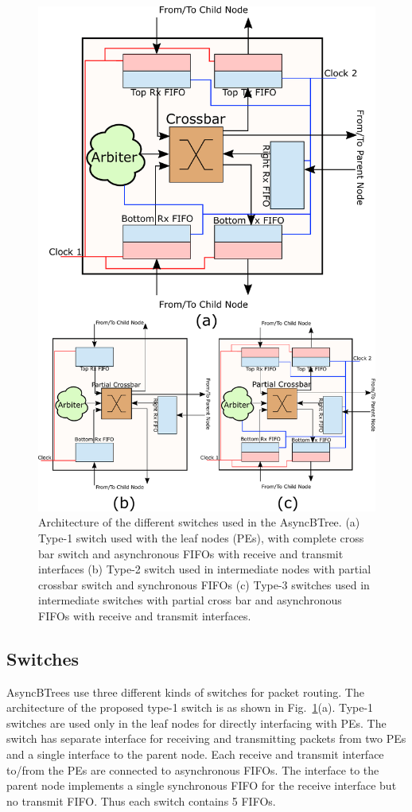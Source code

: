 \begin{figure}[t]
\centering
   \includegraphics[width=\columnwidth]{Figures/switch1_2.pdf}
   \caption{Architecture of the different switches used in the AsyncBTree. (a) Type-1 switch used with the leaf nodes (PEs), with complete cross bar switch and asynchronous 
   FIFOs with receive and transmit interfaces (b) Type-2 switch used in intermediate nodes with partial crossbar switch and synchronous FIFOs (c) Type-3 switches used in intermediate
   switches with partial cross bar and asynchronous FIFOs with receive and transmit interfaces.}
   \label{fig:switchArch}
\end{figure}

\subsection{Switches}
\label{sec:switch}
AsyncBTrees use three different kinds of switches for packet routing.
The architecture of the proposed type-1 switch is as shown in Fig.~\ref{fig:switchArch}(a).
Type-1 switches are used only in the leaf nodes for directly interfacing with PEs.
The switch has separate interface for receiving and transmitting packets from two PEs and a single interface to the parent node.
Each receive and transmit interface to/from the PEs are connected to asynchronous FIFOs.
The interface to the parent node implements a single synchronous FIFO for the receive interface but no transmit FIFO.
Thus each switch contains 5 FIFOs.

